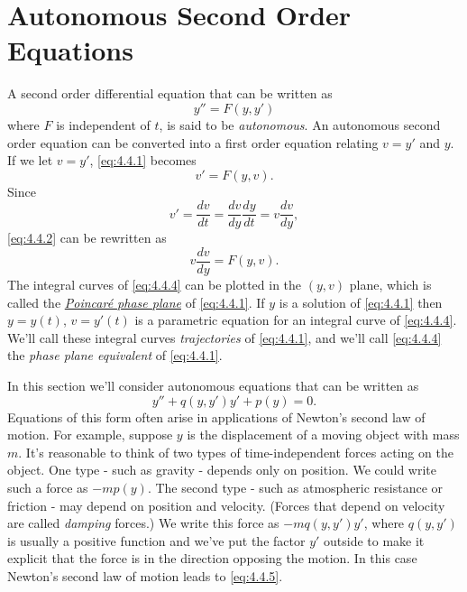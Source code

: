 \section{Autonomous Second Order Equations}

\noindent
A second order differential equation that can be written as
\begin{equation}
  \label{eq:4.4.1}y''=F(y,y')
\end{equation}
where $F$ is independent of $t$, is said to be {\color{blue}\it autonomous\/}. An autonomous second
order equation can be converted into a first order equation relating $v=y'$ and $y$. If we let
$v=y'$, \eqref{eq:4.4.1} becomes
\begin{equation}
  \label{eq:4.4.2}v'=F(y,v).
\end{equation}
Since
\begin{equation}
  \label{eq:4.4.3}v'=\frac{dv}{dt}=\frac{dv}{dy}\frac{dy}{dt}=v\frac{dv}{dy},
\end{equation}
\eqref{eq:4.4.2} can be rewritten as
\begin{equation}
  \label{eq:4.4.4}v\frac{dv}{dy}=F(y,v).
\end{equation}
The integral curves of \eqref{eq:4.4.4} can be plotted in the $(y,v)$ plane, which is called the
\href{https://mathshistory.st-andrews.ac.uk/Biographies/Poincare/}{\color{blue}
\it Poincar\'e phase plane\/} of \eqref{eq:4.4.1}. If $y$ is a solution of \eqref{eq:4.4.1} then
$y=y(t)$, $v=y'(t)$ is a parametric equation for an integral curve of \eqref{eq:4.4.4}. We'll call
these integral curves {\color{blue}\it trajectories\/} of \eqref{eq:4.4.1}, and we'll call
\eqref{eq:4.4.4} the {\color{blue}\it phase plane equivalent\/} of \eqref{eq:4.4.1}.

In this section we'll consider autonomous equations that can be written as
\begin{equation}
  \label{eq:4.4.5}y''+q(y,y')y'+p(y)=0.
\end{equation}
Equations of this form often arise in applications of Newton's second law of motion. For example,
suppose $y$ is the displacement of a moving object with mass $m$. It's reasonable to think of two
types of time-independent forces acting on the object. One type - such as gravity - depends only on
position. We could write such a force as $-mp(y)$. The second type - such as atmospheric resistance
or friction - may depend on position and velocity. (Forces that depend on velocity are called
{\color{blue}\it damping\/} forces.) We write this force as $-mq(y,y')y'$, where $q(y,y')$ is
usually a positive function and we've put the factor $y'$ outside to make it explicit that the force
is in the direction opposing the motion. In this case Newton's second law of motion leads to
\eqref{eq:4.4.5}.

